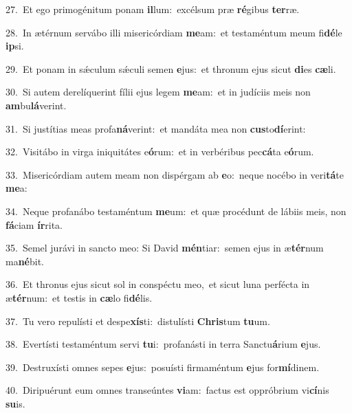 {\numbfont\textcolor{\numbcolor}{27.}}~Et ego primogénitum ponam \textbf{il}\-lum:~\star excélsum præ \textbf{ré}\-gibus \textbf{ter}\-ræ.\par
{\numbfont\textcolor{\numbcolor}{28.}}~In ætérnum servábo illi misericórdiam \textbf{me}\-am:~\star et testaméntum meum fi\-\textbf{dé}\-le \textbf{ip}\-si.\par
{\numbfont\textcolor{\numbcolor}{29.}}~Et ponam in sǽculum sǽculi semen \textbf{e}\-jus:~\star et thronum ejus sicut \textbf{di}\-es \textbf{cæ}\-li.\par
{\numbfont\textcolor{\numbcolor}{30.}}~Si autem derelíquerint fílii ejus legem \textbf{me}\-am:~\star et in judíciis meis non \textbf{am}\-bu\-\textbf{lá}\-verint.\par
{\numbfont\textcolor{\numbcolor}{31.}}~Si justítias meas profa\-\textbf{ná}\-verint:~\star et mandáta mea non \textbf{cus}\-to\-\textbf{dí}\-erint:\par
{\numbfont\textcolor{\numbcolor}{32.}}~Visitábo in virga iniquitátes e\-\textbf{ó}\-rum:~\star et in verbéribus pec\-\textbf{cá}\-ta e\-\textbf{ó}\-rum.\par
{\numbfont\textcolor{\numbcolor}{33.}}~Misericórdiam autem meam non dispérgam ab \textbf{e}\-o:~\star neque nocébo in veri\-\textbf{tá}\-te \textbf{me}\-a:\par
{\numbfont\textcolor{\numbcolor}{34.}}~Neque profanábo testaméntum \textbf{me}\-um:~\star et quæ procédunt de lábiis meis, non \textbf{fá}\-ciam \textbf{ír}\-rita.\par
{\numbfont\textcolor{\numbcolor}{35.}}~Semel jurávi in sancto meo: Si David \textbf{mén}\-tiar:~\star semen ejus in æ\-\textbf{tér}\-num ma\-\textbf{né}\-bit.\par
{\numbfont\textcolor{\numbcolor}{36.}}~Et thronus ejus sicut sol in conspéctu meo,~\dagger et sicut luna perfécta in æ\-\textbf{tér}\-num:~\star et testis in \textbf{cæ}\-lo fi\-\textbf{dé}\-lis.\par
{\numbfont\textcolor{\numbcolor}{37.}}~Tu vero repulísti et despe\-\textbf{xís}\-ti:~\star distulísti \textbf{Chris}\-tum \textbf{tu}\-um.\par
{\numbfont\textcolor{\numbcolor}{38.}}~Evertísti testaméntum servi \textbf{tu}\-i:~\star profanásti in terra Sanctu\-\textbf{á}\-rium \textbf{e}\-jus.\par
{\numbfont\textcolor{\numbcolor}{39.}}~Destruxísti omnes sepes \textbf{e}\-jus:~\star posuísti firmaméntum \textbf{e}\-jus for\-\textbf{mí}\-dinem.\par
{\numbfont\textcolor{\numbcolor}{40.}}~Diripuérunt eum omnes transeúntes \textbf{vi}\-am:~\star factus est oppróbrium vi\-\textbf{cí}\-nis \textbf{su}\-is.\par
